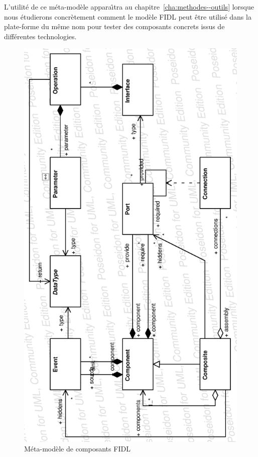 L'utilit\'e de ce m\'eta-mod\`ele appara\^{\i}tra
au chapitre~\ref{cha:methodes--outils} lorsque nous \'etudierons
concr\`etement comment le mod\`ele \textsf{FIDL} peut \^etre utilis\'e dans la
plate-forme du m\^eme nom pour tester des composants concrets issus
de diff\'erentes technologies.

\begin{figure}[htbp]
    \centering
    \includegraphics[angle=-90,width=\textwidth]{figures/fig-mmcomposant.eps}
    \caption{M\'eta-mod\`ele de composants \textsf{FIDL}}
    \label{fig-mmcomposants}
\end{figure}


